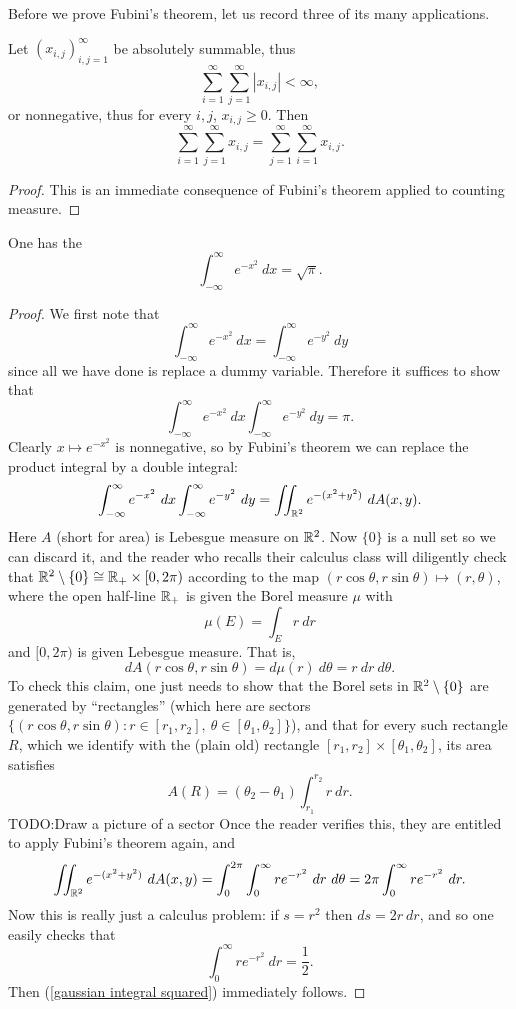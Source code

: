 Before we prove Fubini's theorem, let us record three of its many applications.
\begin{corollary}
Let $(x_{i,j})_{i,j=1}^\infty$ be absolutely summable, thus
\[\sum_{i=1}^{\infty} \sum_{j=1}^{\infty} |x_{i,j}| < \infty,\]
or nonnegative, thus for every $i,j$, $x_{i,j} \geq 0$. Then
\[\sum_{i=1}^{\infty} \sum_{j=1}^{\infty} x_{i,j} = \sum_{j=1}^{\infty} \sum_{i=1}^{\infty} x_{i,j}.\]
\end{corollary}
\begin{proof}
This is an immediate consequence of Fubini's theorem applied to counting measure.
\end{proof}

\begin{corollary}
\label{Gaussian integral formula}
One has the 
\[\int_{-\infty}^{\infty} e^{-x^2} ~dx = \sqrt \pi.\]
\end{corollary}
\begin{proof}
We first note that
\[\int_{-\infty}^{\infty} e^{-x^2}~dx = \int_{-\infty}^{\infty} e^{-y^2}~dy\]
since all we have done is replace a dummy variable. Therefore it suffices to show that
\begin{equation}
\label{gaussian integral squared}
\int_{-\infty}^{\infty} e^{-x^2}~dx \int_{-\infty}^{\infty} e^{-y^2}~dy = \pi.
\end{equation}
Clearly $x \mapsto e^{-x^2}$ is nonnegative, so by Fubini's theorem we can replace the product integral by a double integral:
\[\int_{-\infty}^{\infty} e^{-x^2}~dx \int_{-\infty}^{\infty} e^{-y^2}~dy = \iint_{\mathbb{R}^2} e^{-(x^2 + y^2)}~dA(x, y).\]
Here $A$ (short for area) is Lebesgue measure on $\mathbb{R}^2$.
Now $\{0\}$ is a null set so we can discard it, and the reader who recalls their calculus class will diligently check that $\mathbb{R}^2 \setminus \{0\} \cong \mathbb{R}_+ \times [0, 2\pi)$ according to the map $(r \cos \theta, r \sin \theta) \mapsto (r, \theta)$, where the open half-line $\mathbb{R}_+$ is given the Borel measure $\mu$ with
\[\mu(E) = \int_{E} r~dr\]
and $[0, 2\pi)$ is given Lebesgue measure. That is,
\[dA(r \cos \theta, r \sin \theta) = d\mu(r) ~d\theta = r~dr~d\theta.\]
To check this claim, one just needs to show that the Borel sets in $\mathbb{R}^2 \setminus \{0\}$ are generated by ``rectangles'' (which here are sectors $\{(r \cos \theta, r \sin \theta): r \in [r_1, r_2], ~\theta \in [\theta_1, \theta_2]\}$), and that for every such rectangle $R$, which we identify with the (plain old) rectangle $[r_1, r_2] \times [\theta_1, \theta_2]$, its area satisfies
\[A(R) = (\theta_2 - \theta_1)\int_{r_1}^{r_2} r~dr.\]
TODO:Draw a picture of a sector
Once the reader verifies this, they are entitled to apply Fubini's theorem again, and
\[\iint_{\mathbb{R}^2} e^{-(x^2 + y^2)}~dA(x, y) = \int_0^{2\pi} \int_0^{\infty} re^{-r^2}~dr~d\theta = 2\pi \int_0^{\infty} re^{-r^2}~dr.\]
Now this is really just a calculus problem: if $s = r^2$ then $ds = 2r~dr$, and so one easily checks that
\[\int_0^{\infty} re^{-r^2}~dr = \frac{1}{2}.\]
Then (\ref{gaussian integral squared}) immediately follows.
\end{proof}

